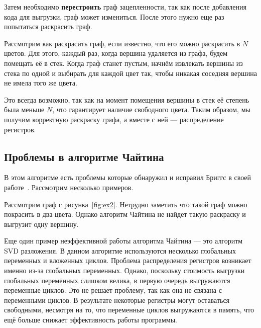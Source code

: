 Затем необходимо \textbf{перестроить} граф зацепленности, так как после добавления кода для выгрузки, граф может измениться. После этого нужно
еще раз попытаться раскрасить граф.

Рассмотрим как раскрасить граф, если известно, что его можно раскрасить в $N$ цветов. Для этого, каждый раз, когда вершина
удаляется из графа, будем помещать её в стек. Когда граф станет пустым, начнём извлекать вершины из стека по одной и выбирать
для каждой цвет так, чтобы никакая соседняя вершина не имела того же цвета. 

Это всегда возможно, так как на момент помещения вершины в стек её степень была меньше $N$, что гарантирует наличие свободного
цвета. Таким образом, мы получим корректную раскраску графа, а вместе с ней — распределение регистров.

\subsection{Проблемы в алгоритме Чайтина}

В этом алгоритме есть проблемы которые обнаружил и исправил Бриггс в своей работе~\cite{briggs1994}.
Рассмотрим несколько примеров.

Рассмотрим граф с рисунка~\ref{fig:ex2}. Нетрудно заметить что такой граф можно покрасить в два цвета.
Однако алгоритм Чайтина не найдет такую раскраску и выгрузит одну вершину.

\begin{figure}[H]
    \centering
\end{figure} %

Еще один пример неэффективной работы алгоритма Чайтина — это алгоритм SVD разложения.
В данном алгоритме используются несколько глобальных переменных и вложенных циклов.
Проблема распределения регистров возникает именно из-за глобальных переменных.  
Однако, поскольку стоимость выгрузки глобальных переменных слишком велика, в первую очередь выгружаются переменные циклов.
Это не решает проблему, так как она не связана с переменными циклов. 
В результате некоторые регистры могут оставаться свободными, несмотря на то, что переменные циклов выгружаются в память,
что ещё больше снижает эффективность работы программы.

